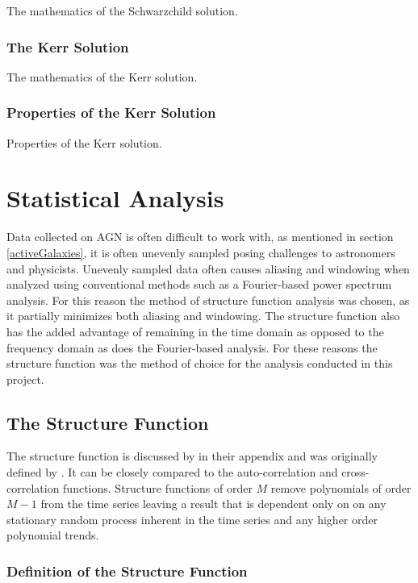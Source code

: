\documentclass[12pt, oneside]{smuthesis}
\begin{document}
The mathematics of the Schwarzchild solution.

\subsection{\sc The Kerr Solution} \label{kerrSolution}

The mathematics of the Kerr solution.

\subsection{\sc Properties of the Kerr Solution} \label{kerrSolutionProperties}

Properties of the Kerr solution.

\chapter{\sc Statistical Analysis} \label{statisticalAnalysis}

Data collected on AGN is often difficult to work with, as mentioned in section \ref{activeGalaxies}, it is often unevenly sampled posing challenges to astronomers and physicists. Unevenly sampled data often causes aliasing and windowing when analyzed using conventional methods such as a Fourier-based power spectrum analysis. For this reason the method of structure function analysis was chosen, as it partially minimizes both aliasing and windowing. The structure function also has the added advantage of remaining in the time domain as opposed to the frequency domain as does the Fourier-based analysis. For these reasons the structure function was the method of choice for the analysis conducted in this project.

\section{\sc The Structure Function} \label{structureFunction}

The structure function is discussed by \citep{cordes1985} in their appendix and was originally defined by \citep{rutman}. It can be closely compared to the auto-correlation and cross-correlation functions. Structure functions of order $M$ remove polynomials of order $M-1$ from the time series leaving a result that is dependent only on on any stationary random process inherent in the time series and any higher order polynomial trends.

\subsection{\sc Definition of the Structure Function} \label{structureFunctionDefinition}
\end{document}
